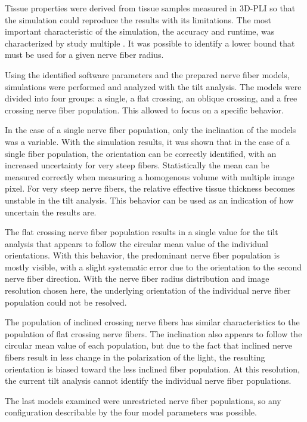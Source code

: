 Tissue properties were derived from tissue samples measured in \ac{3D-PLI} so that the simulation could reproduce the results with its limitations.
The most important characteristic of the simulation, the accuracy and runtime, was characterized by study multiple \Voxelsize{}.
It was possible to identify a lower bound that must be used for a given nerve fiber radius.
\par
% 
Using the identified software parameters and the prepared nerve fiber models, simulations were performed and analyzed with the tilt analysis.
The models were divided into four groups: a single, a flat crossing, an oblique crossing, and a free crossing nerve fiber population.
This allowed to focus on a specific behavior.
\par
% 
In the case of a single nerve fiber population, only the inclination of the models was a variable.
With the simulation results, it was shown that in the case of a single fiber population, the orientation can be correctly identified, with an increased uncertainty for very steep fibers.
Statistically the mean can be measured correctly when measuring a homogenous volume with multiple image pixel.
For very steep nerve fibers, the relative effective tissue thickness becomes unstable in the tilt analysis.
This behavior can be used as an indication of how uncertain the results are.
\par
% 
The flat crossing nerve fiber population results in a single value for the tilt analysis that appears to follow the circular mean value of the individual orientations.
With this behavior, the predominant nerve fiber population is mostly visible, with a slight systematic error due to the orientation to the second nerve fiber direction.
With the nerve fiber radius distribution and image resolution chosen here, the underlying orientation of the individual nerve fiber population could not be resolved.
\par
% 
The population of inclined crossing nerve fibers has similar characteristics to the population of flat crossing nerve fibers.
The inclination also appears to follow the circular mean value of each population, but due to the fact that inclined nerve fibers result in less change in the polarization of the light, the resulting orientation is biased toward the less inclined fiber population.
At this resolution, the current tilt analysis cannot identify the individual nerve fiber populations.
\par
% 
The last models examined were unrestricted nerve fiber populations, so any configuration describable by the four model parameters was possible.
